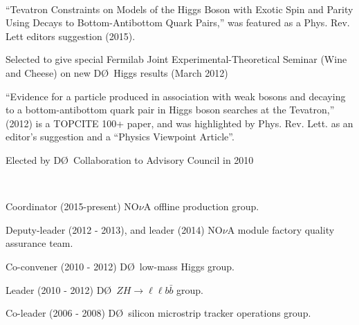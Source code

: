 \documentclass[amsmath,amssymb]{revtex4}
\def\dzero{D\O}
\begin{document}
\\
\begin{list}{}
            {\setlength{\itemsep}{0.0in}\setlength{\parsep}{0.0in}
             \addtolength{\parskip}{-0.5in}}
\item ``Tevatron Constraints  on Models of the Higgs Boson with Exotic Spin and Parity Using Decays to
        Bottom-Antibottom Quark Pairs,'' was featured as a  Phys. Rev. Lett editors suggestion (2015).
\item Selected to give special Fermilab Joint Experimental-Theoretical Seminar (Wine and Cheese)
      on new \dzero~Higgs results (March 2012)
\item  ``Evidence for a particle produced in association with weak bosons and decaying to a
        bottom-antibottom quark pair in Higgs boson searches at the Tevatron,'' (2012) is a TOPCITE 100+ paper, and
        was highlighted by Phys. Rev. Lett. as an editor's suggestion and a ``Physics Viewpoint Article''.
\item Elected by \dzero~Collaboration to Advisory Council in 2010
\end{list}
\vspace{\baselineskip}

\\
\begin{list}{}
            {\setlength{\itemsep}{0.0in}\setlength{\parsep}{0.0in}
             \addtolength{\parskip}{-0.5in}}
\item Coordinator (2015-present)  NO$\nu$A offline production group.
\item Deputy-leader (2012 - 2013), and leader (2014) NO$\nu$A module factory quality assurance team.
\item Co-convener (2010 - 2012) \dzero~low-mass Higgs group.
\item Leader (2010 - 2012) \dzero~$ZH\to\ell\ell b\bar{b}$ group.
\item Co-leader (2006 - 2008) \dzero~silicon microstrip tracker operations group.
\end{list}
\vspace{\baselineskip}
\end{document}
